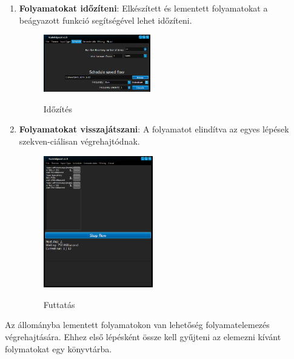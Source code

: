 \begin{enumerate}
{\begin{figure}[h!]
\begin{center}
			\end{center}
		\end{figure}
	}
	\item{
		\textbf{Folyamatokat időzíteni}: Elkészített és lementett folyamatokat a beágyazott funkció segítségével lehet időzíteni.
		\begin{figure}[h!]
			\begin{center}
				\caption{Időzítés}
				\includegraphics[width=0.45\textwidth, keepaspectratio=true]{images/img_flow_schedule}\\
				\label{fig:example}
			\end{center}
		\end{figure}
	}
	\item{
		\textbf{Folyamatokat visszajátszani}: A folyamatot elindítva az egyes lépések szekven\hyp{}ciálisan végrehajtódnak.
		\begin{figure}[h!]
			\begin{center}
				\caption{Futtatás}
				\includegraphics[width=0.45\textwidth, keepaspectratio=true]{images/img_flow_run}\\
				\label{fig:example}
			\end{center}
		\end{figure}
	}

\end{enumerate}


Az állományba lementett folyamatokon van lehetőség folyamatelemezés végrehajtására. Ehhez első lépésként össze kell gyűjteni az elemezni kívánt folymatokat egy könyvtárba.

